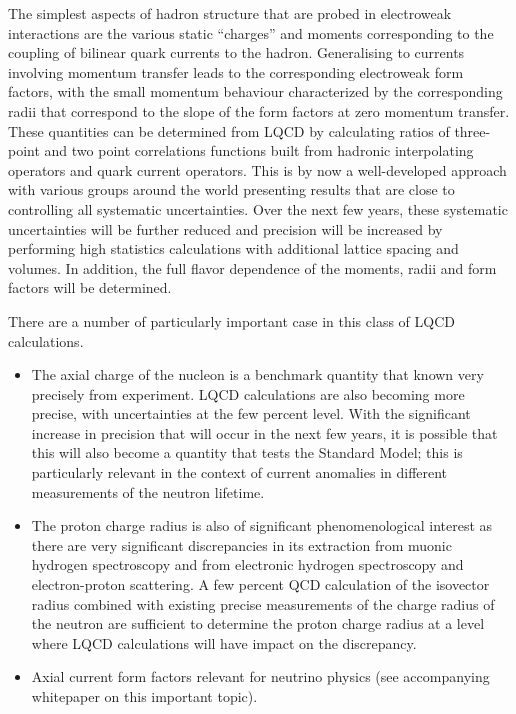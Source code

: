 The simplest aspects of hadron structure that are probed in electroweak interactions are the various static ``charges'' and moments corresponding to the coupling of bilinear quark currents to the hadron. Generalising to currents involving momentum transfer leads to the corresponding electroweak form factors, with the small momentum behaviour characterized by the corresponding radii that correspond to the slope of the form factors at zero momentum transfer. These quantities can be determined from LQCD by calculating ratios of three-point and two point correlations functions built from hadronic interpolating operators and quark current operators. This is by now a well-developed approach with various groups around the world presenting results that are close to controlling all systematic uncertainties. Over the next few years, these systematic uncertainties will be further reduced  and  precision will be increased by performing high statistics calculations with additional lattice spacing and volumes. In addition, the full flavor dependence of the moments, radii and form factors will be determined. 

There are a number of particularly important case in this class of LQCD calculations. 
\begin{itemize}
	\item The axial charge of the nucleon is a benchmark quantity that known very precisely from experiment. LQCD calculations are also becoming more precise, with uncertainties at the few percent level. With the significant increase in precision that will occur in the next few years, it is possible that this will also become a quantity that tests the Standard Model; this is particularly relevant in the context of current anomalies in different measurements of the neutron lifetime.
	\item The proton charge radius is also of significant phenomenological interest as there are very significant discrepancies in its extraction from muonic hydrogen spectroscopy  and from electronic hydrogen spectroscopy and electron-proton scattering. A few percent QCD calculation of the isovector radius combined with existing precise measurements of the charge radius of the neutron are sufficient to determine the proton charge radius at a level where  LQCD calculations will  have impact on the discrepancy.
	\item Axial current form factors relevant for neutrino physics (see accompanying whitepaper on this important topic).
\end{itemize} 


